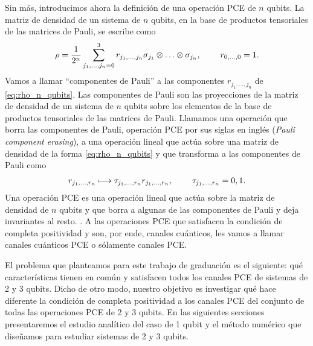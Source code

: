 Sin más, introducimos ahora la definición de una operación PCE de 
$n$ qubits. La matriz de densidad de un sistema de $n$ qubits, en la base de
productos tensoriales de las matrices de Pauli, se escribe como
\begin{align}\label{eq:rho_n_qubits}
\rho=\frac{1}{2^n}\sum_{j_1,\ldots,j_n=0}^3
r_{j_1,\ldots,j_n}\sigma_{j_1}\otimes\ldots\otimes\sigma_{j_n},
\hspace{.8cm} r_{0,\ldots,0}=1.
\end{align}
Vamos a llamar ``componentes de Pauli'' a las componentes $r_{j_1,\ldots,j_n}$
de \eqref{eq:rho_n_qubits}. Las componentes de Pauli son las proyecciones
de la matriz de densidad de un sistema de $n$ qubits sobre los elementos
de la base de productos tensoriales de las matrices de Pauli.
Llamamos una operación que borra las componentes de Pauli, 
operación PCE por sus siglas en inglés (\textit{Pauli
component erasing}), a una operación lineal que actúa sobre una 
matriz de densidad de la forma \eqref{eq:rho_n_qubits} y 
que transforma a las componentes de Pauli como
\begin{align}
r_{j_1,\ldots,r_n}\longmapsto \tau_{j_1,\ldots,r_n}r_{j_1,\ldots,r_n},
\hspace{.8cm} \tau_{j_1,\ldots,r_n} = 0,1.
\end{align}
Una operación PCE es una operación lineal que actúa sobre la matriz 
de densidad de $n$ qubits y que borra a algunas de las componentes de 
Pauli y deja invariantes al resto.
. A las operaciones PCE que satisfacen 
la condición de completa positividad y son, por ende, canales cuánticos,
les vamos a llamar canales cuánticos PCE o sólamente canales PCE.

El problema que planteamos para este trabajo de graduación es
el siguiente: qué características tienen en común y satisfacen todos 
los canales PCE de sistemas de 2 y 3 qubits. Dicho de otro modo, 
nuestro objetivo es investigar qué hace diferente la condición de 
completa positividad a los canales PCE del conjunto de todas las 
operaciones PCE de 2 y 3 qubits.
En las siguientes secciones presentaremos el estudio analítico del 
caso de 1 qubit y el método numérico que diseñamos 
para estudiar sistemas de 2 y 3 qubits. 




